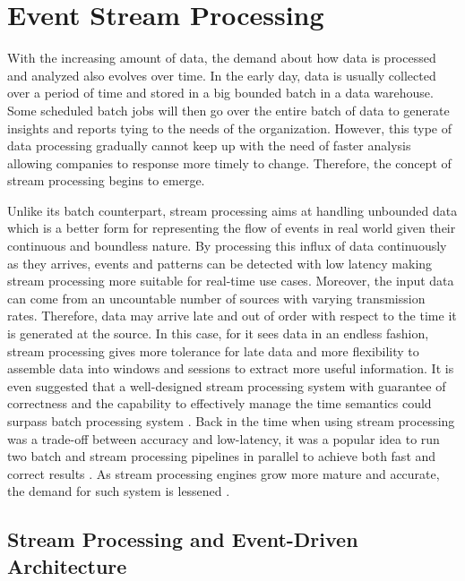 \section{Event Stream Processing} \label{section:eventstreamprocessing}
With the increasing amount of data, the demand about how data is processed and analyzed also evolves over time. In the early day, data is usually collected over a period of time and stored in a big bounded batch in a data warehouse. Some scheduled batch jobs will then go over the entire batch of data to generate insights and reports tying to the needs of the organization. However, this type of data processing gradually cannot keep up with the need of faster analysis allowing companies to response more timely to change. Therefore, the concept of stream processing begins to emerge.


Unlike its batch counterpart, stream processing aims at handling unbounded data which is a better form for representing the flow of events in real world given their continuous and boundless nature. By processing this influx of data continuously as they arrives, events and patterns can be detected with low latency making stream processing more suitable for real-time use cases. Moreover, the input data can come from an uncountable number of sources with varying transmission rates. Therefore, data may arrive late and out of order with respect to the time it is generated at the source. In this case, for it sees data in an endless fashion, stream processing gives more tolerance for late data and more flexibility to assemble data into windows and sessions to extract more useful information. It is even suggested that a well-designed stream processing system with guarantee of correctness and the capability to effectively manage the time semantics could surpass batch processing system \cite{stream101}. Back in the time when using stream processing was a trade-off between accuracy and low-latency, it was a popular idea to run two batch and stream processing pipelines in parallel to achieve both fast and correct results \cite{lambdaarchitecture}.  As stream processing engines grow more mature and accurate, the demand for such system is lessened \cite{questionlambdaarchitecture}.
\subsection{Stream Processing and Event-Driven Architecture}

